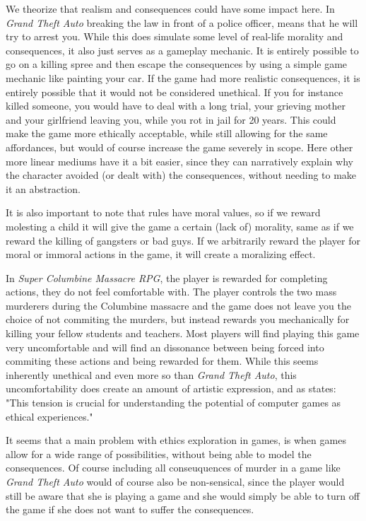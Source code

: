 We theorize that realism and consequences could have some impact here. In \textit{Grand Theft Auto} breaking the law in front of a police officer, means that he will try to arrest you. While this does simulate some level of real-life morality and consequences, it also just serves as a gameplay mechanic. It is entirely possible to go on a killing spree and then escape the consequences by using a simple game mechanic like painting your car. If the game had more realistic consequences, it is entirely possible that it would not be considered unethical. If you for instance killed someone, you would have to deal with a long trial, your grieving mother and your girlfriend leaving you, while you rot in jail for 20 years. This could make the game more ethically acceptable, while still allowing for the same affordances, but would of course increase the game severely in scope. Here other more linear mediums have it a bit easier, since they can narratively explain why the character avoided (or dealt with) the consequences, without needing to make it an abstraction. \

It is also important to note that rules have moral values, so if we reward molesting a child it will give the game a certain (lack of) morality, same as if we reward the killing of gangsters or bad guys. If we arbitrarily reward the player for moral or immoral actions in the game, it will create a moralizing effect.\ 

In \textit{Super Columbine Massacre RPG}\cite{ledone2005super}, the player is rewarded for completing actions, they do not feel comfortable with. The player controls the two mass murderers during the Columbine massacre and the game does not leave you the choice of not commiting the murders, but instead rewards you mechanically for killing your fellow students and teachers. Most players will find playing this game very uncomfortable and will find an dissonance between being forced into commiting these actions and being rewarded for them. While this seems inherently unethical and even more so than \textit{Grand Theft Auto}, this uncomfortability does create an amount of artistic expression, and as \citep{sicart2011ethics} states: "This tension is crucial for understanding the potential of computer games as ethical experiences."
\ \commenting{important: bring it up in the conclusion.} \

It seems that a main problem with ethics exploration in games, is when games allow for a wide range of possibilities, without being able to model the consequences. Of course including all conseuquences of murder in a game like \textit{Grand Theft Auto} would of course also be non-sensical, since the player would still be aware that she is playing a game and she would simply be able to turn off the game if she does not want to suffer the consequences.\


